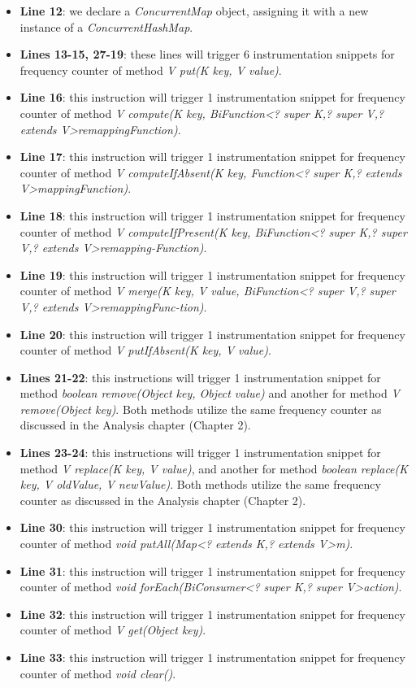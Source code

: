 \documentclass[]{usiinfthesis}
\begin{document}
\begin{itemize}
    \item \textbf{Line 12}: we declare a \textit{ConcurrentMap} object, assigning it with a new instance of a \textit{ConcurrentHashMap}.
    \item \textbf{Lines 13-15, 27-19}: these lines will trigger 6 instrumentation snippets for frequency counter of method \textit{V put(K key, V value)}.
    \item \textbf{Line 16}: this instruction will trigger 1 instrumentation snippet for frequency counter of method \textit{V compute(K key, BiFunction<? super K,? super V,? extends V>remappingFunction)}.
    \item \textbf{Line 17}: this instruction will trigger 1 instrumentation snippet for frequency counter of method \textit{V computeIfAbsent(K key, Function<? super K,? extends V>mappingFunction)}.
    \item \textbf{Line 18}: this instruction will trigger 1 instrumentation snippet for frequency counter of method \textit{V computeIfPresent(K key, BiFunction<?  super K,?  super V,?  extends V>remapping-Function)}.
    \item \textbf{Line 19}: this instruction will trigger 1 instrumentation snippet for frequency counter of method \textit{V merge(K key, V value, BiFunction<?  super V,?  super V,?  extends V>remappingFunc-tion)}.
    \item \textbf{Line 20}: this instruction will trigger 1 instrumentation snippet for frequency counter of method \textit{V putIfAbsent(K key, V value)}.
    \item \textbf{Lines 21-22}: this instructions will trigger 1 instrumentation snippet for method \textit{boolean remove(Object key, Object value)} and another for method \textit{V remove(Object key)}. Both methods utilize the same frequency counter as discussed in the Analysis chapter (Chapter 2). 
    \item \textbf{Lines 23-24}: this instructions will trigger 1 instrumentation snippet for method \textit{V replace(K key, V value)}, and another for method \textit{boolean replace(K key, V oldValue, V newValue)}. Both methods utilize the same frequency counter as discussed in the Analysis chapter (Chapter 2).
    \item \textbf{Line 30}: this instruction will trigger 1 instrumentation snippet for frequency counter of method \textit{void putAll(Map<? extends K,? extends V>m)}.
    \item \textbf{Line 31}: this instruction will trigger 1 instrumentation snippet for frequency counter of method \textit{void forEach(BiConsumer<? super K,? super V>action)}.
    \item \textbf{Line 32}: this instruction will trigger 1 instrumentation snippet for frequency counter of method \textit{V get(Object key)}.
    \item \textbf{Line 33}: this instruction will trigger 1 instrumentation snippet for frequency counter of method \textit{void clear()}.
\end{itemize}
\end{document}
